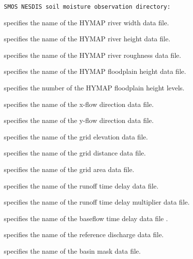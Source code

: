  \begin{Verbatim}[frame=single]
SMOS NESDIS soil moisture observation directory:
 \end{Verbatim}


 
 specifies the name of the HYMAP river width data file.

 specifies the name of the HYMAP river height data file. 

 specifies the name of the HYMAP river roughness data file. 

 specifies the name of the HYMAP floodplain height data file. 

 specifies the number of the HYMAP floodplain height levels. 

 specifies the name of the x-flow direction data file.

 specifies the name of the y-flow direction data file.

 specifies the name of the grid elevation data file.

 specifies the name of the grid distance data file.

 specifies the name of the grid area data file.

  

  

 specifies the name of the runoff time delay data file. 

 specifies the name of the runoff time delay multiplier data file.

 specifies the name of the baseflow time delay data file .

 specifies the name of the reference discharge data file.

 specifies the name of the basin mask data file.

  

  

